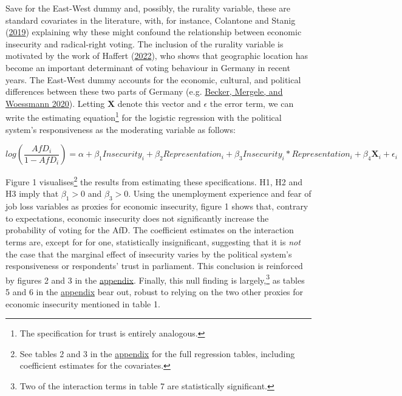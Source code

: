 \documentclass[
]{article}
\begin{document}
Save for the East-West dummy and, possibly, the rurality variable, these
are standard covariates in the literature, with, for instance, Colantone
and Stanig (\protect\hyperlink{ref-colantone_surge_2019}{2019})
explaining why these might confound the relationship between economic
insecurity and radical-right voting. The inclusion of the rurality
variable is motivated by the work of Haffert
(\protect\hyperlink{ref-haffert_stadt_2022}{2022}), who shows that
geographic location has become an important determinant of voting
behaviour in Germany in recent years. The East-West dummy accounts for
the economic, cultural, and political differences between these two
parts of Germany (e.g.
\protect\hyperlink{ref-becker_2020_separation}{Becker, Mergele, and
Woessmann 2020}). Letting \(\textbf{X}\) denote this vector and
\(\epsilon\) the error term, we can write the estimating
equation\footnote{The specification for trust is entirely analogous.}
for the logistic regression with the political system's responsiveness
as the moderating variable as follows:

\[
log(\frac{AfD_{i}}{1-AfD_{i}}) = \alpha + \beta_{1}Insecurity_{i} +  \beta_{2}Representation_{i} + \beta_{3}Insecurity_{i}*Representation_{i} + \beta_{4}\textbf{X}_{i} + \epsilon_{i}
\]

Figure 1 visualises\footnote{See tables 2 and 3 in the
  \protect\hyperlink{appendix}{appendix} for the full regression tables,
  including coefficient estimates for the covariates.} the results from
estimating these specifications. H1, H2 and H3 imply that
\(\beta_{1}>0\) and \(\beta_{3}>0\). Using the unemployment experience
and fear of job loss variables as proxies for economic insecurity,
figure 1 shows that, contrary to expectations, economic insecurity does
not significantly increase the probability of voting for the AfD. The
coefficient estimates on the interaction terms are, except for for one,
statistically insignificant, suggesting that it is \emph{not} the case
that the marginal effect of insecurity varies by the political system's
responsiveness or respondents' trust in parliament. This conclusion is
reinforced by figures 2 and 3 in the
\protect\hyperlink{appendix}{appendix}. Finally, this null finding is
largely,\footnote{Two of the interaction terms in table 7 are
  statistically significant.} as tables 5 and 6 in the
\protect\hyperlink{appendix}{appendix} bear out, robust to relying on
the two other proxies for economic insecurity mentioned in table 1.
\end{document}
